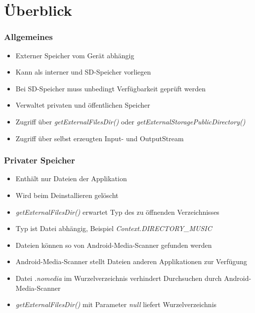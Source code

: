 \section{Überblick}
\begin{frame}
   \frametitle{Allgemeines}
   \begin{itemize}
      \item Externer Speicher vom Gerät abhängig
      \item Kann als interner und SD-Speicher vorliegen
      \item Bei SD-Speicher muss unbedingt Verfügbarkeit geprüft werden
      \item Verwaltet privaten und öffentlichen Speicher
      \item Zugriff über \emph{getExternalFilesDir()} oder \emph{getExternalStoragePublicDirectory()}
      \item Zugriff über selbst erzeugten Input- und OutputStream
   \end{itemize}
   
	
\end{frame}

\begin{frame}
   \frametitle{Privater Speicher}
   \begin{itemize}
   	\item Enthält nur Dateien der Applikation
   	\item Wird beim Deinstallieren gelöscht
      \item \emph{getExternalFilesDir()} erwartet Typ des zu öffnenden Verzeichnisses
      \item Typ ist Datei abhängig, Beispiel \emph{Context.DIRECTORY\_MUSIC}
      \item Dateien können so von Android-Media-Scanner gefunden werden
      \item Android-Media-Scanner stellt Dateien anderen Applikationen zur Verfügung
      \item Datei \emph{.nomedia} im Wurzelverzeichnis verhindert Durchsuchen 
      	durch Android-Media-Scanner
      \item \emph{getExternalFilesDir()} mit Parameter \emph{null} liefert 
      	Wurzelverzeichnis
   \end{itemize}
\end{frame}

